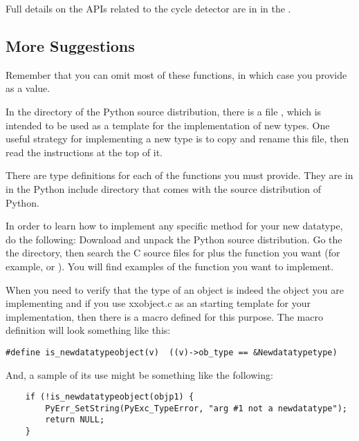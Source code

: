 

Full details on the APIs related to the cycle detector are in
 in the
.


\subsection{More Suggestions}

Remember that you can omit most of these functions, in which case you
provide  as a value.

In the  directory of the Python source distribution,
there is a file , which is intended to be used as a
template for the implementation of new types.  One useful strategy
for implementing a new type is to copy and rename this file, then
read the instructions at the top of it.

There are type definitions for each of the functions you must
provide.  They are in  in the Python include
directory that comes with the source distribution of Python.

In order to learn how to implement any specific method for your new
datatype, do the following: Download and unpack the Python source
distribution.  Go the the  directory, then search the
C source files for  plus the function you want (for
example,  or ).  You will find
examples of the function you want to implement.

When you need to verify that the type of an object is indeed the
object you are implementing and if you use xxobject.c as an starting
template for your implementation, then there is a macro defined for
this purpose. The macro definition will look something like this:

\begin{verbatim}
#define is_newdatatypeobject(v)  ((v)->ob_type == &Newdatatypetype)
\end{verbatim}

And, a sample of its use might be something like the following:

\begin{verbatim}
    if (!is_newdatatypeobject(objp1) {
        PyErr_SetString(PyExc_TypeError, "arg #1 not a newdatatype");
        return NULL;
    }
\end{verbatim}
